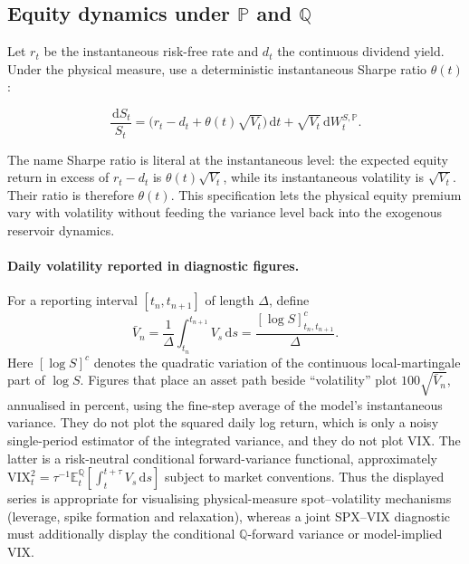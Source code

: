 \documentclass[11pt,a4paper]{article}
\newcommand{\Pp}{\mathbb{P}}
\newcommand{\Qq}{\mathbb{Q}}
\newcommand{\E}{\mathbb{E}}
\newcommand{\dd}{\,\mathrm{d}}
\begin{document}
\subsection{Equity dynamics under \texorpdfstring{\(\Pp\)}{P} and
\texorpdfstring{\(\Qq\)}{Q}}

Let \(r_t\) be the instantaneous risk-free rate and \(d_t\) the continuous dividend yield.
Under the physical measure, use a deterministic instantaneous Sharpe ratio \(\theta(t)\):

\begin{equation}
\frac{\dd S_t}{S_t}
=\bigl(r_t-d_t+\theta(t)\sqrt{V_t}\bigr)\dd t
+\sqrt{V_t}\dd W_t^{S,\Pp}.
\label{eq:stock-P}
\end{equation}

The name Sharpe ratio is literal at the instantaneous level: the expected equity return in
excess of \(r_t-d_t\) is \(\theta(t)\sqrt{V_t}\), while its instantaneous volatility is
\(\sqrt{V_t}\). Their ratio is therefore \(\theta(t)\). This specification lets the physical
equity premium vary with volatility without feeding the variance level back into the exogenous
reservoir dynamics.

\paragraph{Daily volatility reported in diagnostic figures.}
For a reporting interval \([t_n,t_{n+1}]\) of length \(\Delta\), define
\begin{equation}
\bar V_n=\frac{1}{\Delta}\int_{t_n}^{t_{n+1}}V_s\dd s
=\frac{[\log S]^c_{t_n,t_{n+1}}}{\Delta}.
\label{eq:daily-average-variance}
\end{equation}
Here \([\log S]^c\) denotes the quadratic variation of the continuous local-martingale part
of \(\log S\). Figures that place an asset path beside ``volatility'' plot
\(100\sqrt{\bar V_n}\), annualised in percent, using the fine-step average of the model's
instantaneous variance. They do not plot the squared daily log return, which is only a noisy
single-period estimator of the integrated variance, and they do not plot VIX. The latter is a
risk-neutral conditional forward-variance functional, approximately
\(\mathrm{VIX}_t^2=\tau^{-1}\E_t^{\Qq}[\int_t^{t+\tau}V_s\dd s]\) subject to market
conventions. Thus the displayed series is appropriate for visualising physical-measure
spot--volatility mechanisms (leverage, spike formation and relaxation), whereas a joint
SPX--VIX diagnostic must additionally display the conditional \(\Qq\)-forward variance or
model-implied VIX.
\end{document}
